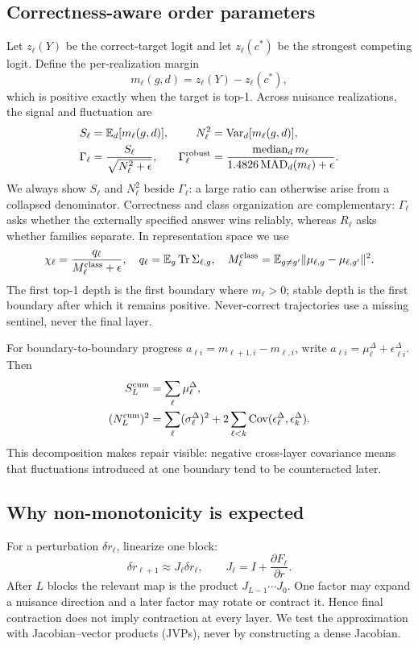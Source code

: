\documentclass[10pt]{article}
\begin{document}
\subsection{Correctness-aware order parameters}
Let $z_\ell(Y)$ be the correct-target logit and let $z_\ell(c^*)$ be the strongest competing logit. Define the per-realization margin
\begin{equation}m_\ell(g,d)=z_\ell(Y)-z_\ell(c^*),\end{equation}
which is positive exactly when the target is top-1. Across nuisance realizations, the signal and fluctuation are
\begin{align}S_\ell&=\mathbb E_d[m_\ell(g,d)],&N_\ell^2&=\operatorname{Var}_d[m_\ell(g,d)],\\
\Gamma_\ell&=\frac{S_\ell}{\sqrt{N_\ell^2+\epsilon}},&
\Gamma_\ell^{\rm robust}&=\frac{\operatorname{median}_d m_\ell}{1.4826\operatorname{MAD}_d(m_\ell)+\epsilon}.
\end{align}
We always show $S_\ell$ and $N_\ell^2$ beside $\Gamma_\ell$: a large ratio can otherwise arise from a collapsed denominator.  Correctness and class organization are complementary: $\Gamma_\ell$ asks whether the externally specified answer wins reliably, whereas $R_\ell$ asks whether families separate. In representation space we use
\begin{equation}\chi_\ell=\frac{q_\ell}{M_\ell^{\rm class}+\epsilon},\quad q_\ell=\mathbb E_g\operatorname{Tr}\Sigma_{\ell,g},\quad M_\ell^{\rm class}=\mathbb E_{g\ne g'}\|\mu_{\ell,g}-\mu_{\ell,g'}\|^2.\end{equation}
The first top-1 depth is the first boundary where $m_\ell>0$; stable depth is the first boundary after which it remains positive. Never-correct trajectories use a missing sentinel, never the final layer.

For boundary-to-boundary progress $a_{\ell i}=m_{\ell+1,i}-m_{\ell,i}$, write $a_{\ell i}=\mu_\ell^\Delta+\epsilon_{\ell i}^\Delta$. Then
\begin{align}S_L^{\rm cum}&=\sum_\ell\mu_\ell^\Delta,\\
(N_L^{\rm cum})^2&=\sum_\ell(\sigma_\ell^\Delta)^2+2\sum_{\ell<k}\operatorname{Cov}(\epsilon_\ell^\Delta,\epsilon_k^\Delta).
\end{align}
This decomposition makes repair visible: negative cross-layer covariance means that fluctuations introduced at one boundary tend to be counteracted later.

\subsection{Why non-monotonicity is expected}
For a perturbation $\delta r_\ell$, linearize one block:
\begin{equation}\delta r_{\ell+1}\approx J_\ell\delta r_\ell,\qquad J_\ell=I+\frac{\partial F_\ell}{\partial r}.\end{equation}
After $L$ blocks the relevant map is the product $J_{L-1}\cdots J_0$.  One factor may expand a nuisance direction and a later factor may rotate or contract it.  Hence final contraction does not imply contraction at every layer.  We test the approximation with Jacobian--vector products (JVPs), never by constructing a dense Jacobian.
\end{document}
